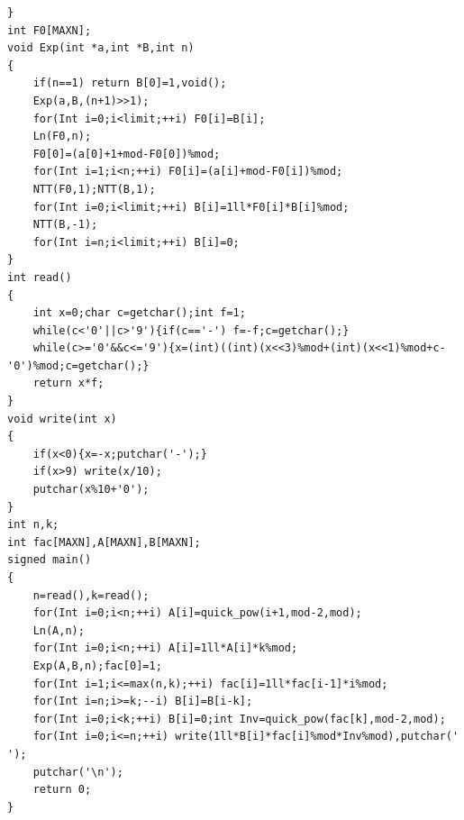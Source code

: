 \begin{verbatim}
}
int F0[MAXN];
void Exp(int *a,int *B,int n)
{
    if(n==1) return B[0]=1,void();
    Exp(a,B,(n+1)>>1);
    for(Int i=0;i<limit;++i) F0[i]=B[i];
    Ln(F0,n);
    F0[0]=(a[0]+1+mod-F0[0])%mod;
    for(Int i=1;i<n;++i) F0[i]=(a[i]+mod-F0[i])%mod;
    NTT(F0,1);NTT(B,1);
    for(Int i=0;i<limit;++i) B[i]=1ll*F0[i]*B[i]%mod;
    NTT(B,-1);
    for(Int i=n;i<limit;++i) B[i]=0;
}
int read()
{
    int x=0;char c=getchar();int f=1;
    while(c<'0'||c>'9'){if(c=='-') f=-f;c=getchar();}
    while(c>='0'&&c<='9'){x=(int)((int)(x<<3)%mod+(int)(x<<1)%mod+c-'0')%mod;c=getchar();}
    return x*f;
}
void write(int x)
{
    if(x<0){x=-x;putchar('-');}
    if(x>9) write(x/10);
    putchar(x%10+'0');
}
int n,k;
int fac[MAXN],A[MAXN],B[MAXN];
signed main()
{
    n=read(),k=read();
    for(Int i=0;i<n;++i) A[i]=quick_pow(i+1,mod-2,mod);
    Ln(A,n);
    for(Int i=0;i<n;++i) A[i]=1ll*A[i]*k%mod;
    Exp(A,B,n);fac[0]=1;
    for(Int i=1;i<=max(n,k);++i) fac[i]=1ll*fac[i-1]*i%mod;
    for(Int i=n;i>=k;--i) B[i]=B[i-k];
    for(Int i=0;i<k;++i) B[i]=0;int Inv=quick_pow(fac[k],mod-2,mod);
    for(Int i=0;i<=n;++i) write(1ll*B[i]*fac[i]%mod*Inv%mod),putchar(' ');
    putchar('\n');
    return 0;
}
\end{verbatim}
